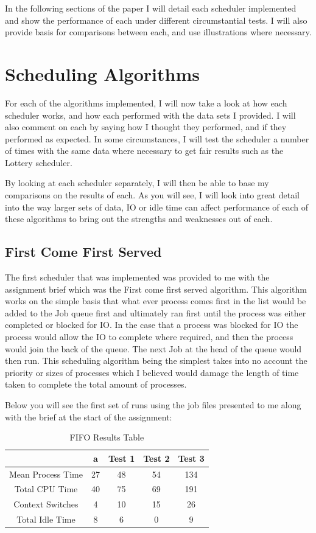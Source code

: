 \documentclass{sig-alternate}
\begin{document}
In the following sections of the paper I will detail each scheduler implemented
and show the performance of each under different circumstantial tests. I will
also provide basis for comparisons between each, and use illustrations where
necessary.
\vspace{3mm}

\section{{\secit Scheduling} Algorithms}
For each of the algorithms implemented, I will now take a look at how each
scheduler works, and how each performed with the data sets I provided. I will
also comment on each by saying how I thought they performed, and if they
performed as expected. In some circumstances, I will test the scheduler a number
of times with the same data where necessary to get fair results such as the
Lottery scheduler. 

By looking at each scheduler separately, I will then be able to base my
comparisons on the results of each. As you will see, I will look into great
detail into the way larger sets of data, IO or idle time can affect performance
of each of these algorithms to bring out the strengths and weaknesses out of
each. 

\subsection{First Come First Served}
The first scheduler that was implemented was provided to me with the assignment
brief which was the First come first served algorithm. This algorithm works on
the simple basis that what ever process comes first in the list would be added
to the Job queue first and ultimately ran first until the process was either
completed or blocked for IO. In the case that a process was blocked for IO the
process would allow the IO to complete where required, and then the process
would join the back of the queue. The next Job at the head of the queue would
then run. 
This scheduling algorithm being the simplest takes into no account the priority
or sizes of processes which I believed would damage the length of time taken to
complete the total amount of processes.

Below you will see the first set of runs using the job files presented to me
along with the brief at the start of the assignment:
\begin{table}[!h]
\centering
\caption{FIFO Results Table}
\begin{tabular}{|c|c|c|c|c|} \hline
&a&Test 1&Test 2&Test 3\\ \hline
Mean Process Time&27&48&54&134\\ \hline
Total CPU Time&40&75&69&191\\ \hline
Context Switches&4&10&15&26\\ \hline
Total Idle Time&8&6&0&9\\ \hline
\end{tabular}
\end{table}
\end{document}
